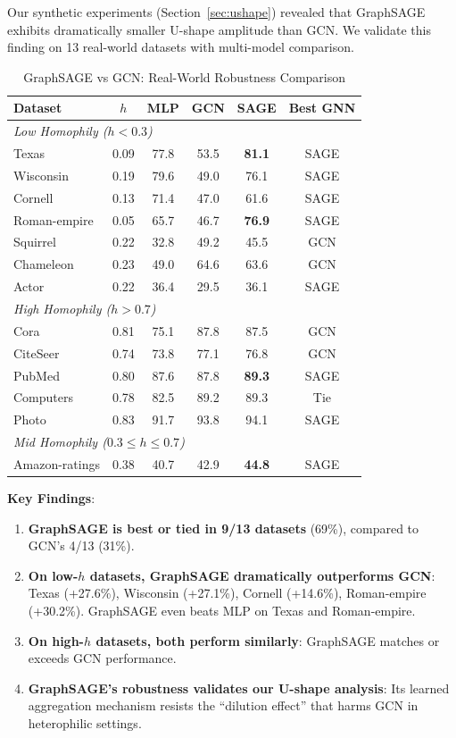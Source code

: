 Our synthetic experiments (Section~\ref{sec:ushape}) revealed that GraphSAGE exhibits dramatically smaller U-shape amplitude than GCN. We validate this finding on 13 real-world datasets with multi-model comparison.

\begin{table}[t]
\centering
\caption{GraphSAGE vs GCN: Real-World Robustness Comparison}
\label{tab:graphsage_validation}
\small
\begin{tabular}{@{}lccccc@{}}
\toprule
\textbf{Dataset} & \textbf{$h$} & \textbf{MLP} & \textbf{GCN} & \textbf{SAGE} & \textbf{Best GNN} \\
\midrule
\multicolumn{6}{l}{\textit{Low Homophily ($h < 0.3$)}} \\
Texas & 0.09 & 77.8 & 53.5 & \textbf{81.1} & SAGE \\
Wisconsin & 0.19 & 79.6 & 49.0 & 76.1 & SAGE \\
Cornell & 0.13 & 71.4 & 47.0 & 61.6 & SAGE \\
Roman-empire & 0.05 & 65.7 & 46.7 & \textbf{76.9} & SAGE \\
Squirrel & 0.22 & 32.8 & 49.2 & 45.5 & GCN \\
Chameleon & 0.23 & 49.0 & 64.6 & 63.6 & GCN \\
Actor & 0.22 & 36.4 & 29.5 & 36.1 & SAGE \\
\midrule
\multicolumn{6}{l}{\textit{High Homophily ($h > 0.7$)}} \\
Cora & 0.81 & 75.1 & 87.8 & 87.5 & GCN \\
CiteSeer & 0.74 & 73.8 & 77.1 & 76.8 & GCN \\
PubMed & 0.80 & 87.6 & 87.8 & \textbf{89.3} & SAGE \\
Computers & 0.78 & 82.5 & 89.2 & 89.3 & Tie \\
Photo & 0.83 & 91.7 & 93.8 & 94.1 & SAGE \\
\midrule
\multicolumn{6}{l}{\textit{Mid Homophily ($0.3 \leq h \leq 0.7$)}} \\
Amazon-ratings & 0.38 & 40.7 & 42.9 & \textbf{44.8} & SAGE \\
\bottomrule
\end{tabular}
\end{table}

\textbf{Key Findings}:
\begin{enumerate}
    \item \textbf{GraphSAGE is best or tied in 9/13 datasets} (69\%), compared to GCN's 4/13 (31\%).
    \item \textbf{On low-$h$ datasets, GraphSAGE dramatically outperforms GCN}: Texas (+27.6\%), Wisconsin (+27.1\%), Cornell (+14.6\%), Roman-empire (+30.2\%). GraphSAGE even beats MLP on Texas and Roman-empire.
    \item \textbf{On high-$h$ datasets, both perform similarly}: GraphSAGE matches or exceeds GCN performance.
    \item \textbf{GraphSAGE's robustness validates our U-shape analysis}: Its learned aggregation mechanism resists the ``dilution effect'' that harms GCN in heterophilic settings.
\end{enumerate}

